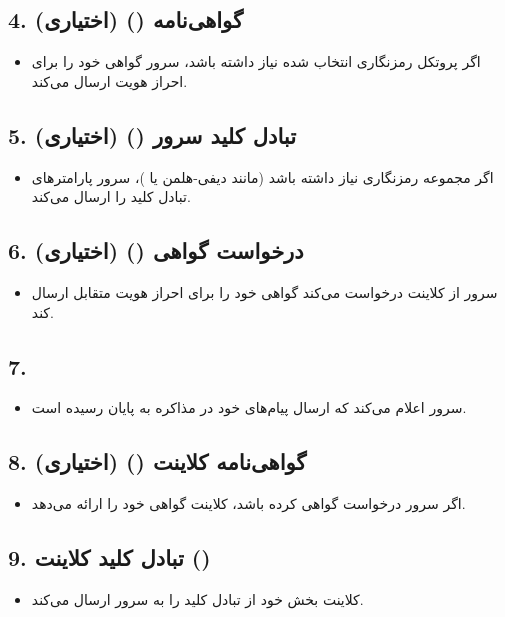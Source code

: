 \subsection*{4. گواهی‌نامه () (اختیاری)}
\begin{itemize}
    \item اگر پروتکل رمزنگاری انتخاب شده نیاز داشته باشد، سرور گواهی خود را برای احراز هویت ارسال می‌کند.
\end{itemize}

\subsection*{5. تبادل کلید سرور () (اختیاری)}
\begin{itemize}
    \item اگر مجموعه رمزنگاری نیاز داشته باشد (مانند دیفی-هلمن یا )، سرور پارامترهای تبادل کلید را ارسال می‌کند.
\end{itemize}

\subsection*{6. درخواست گواهی () (اختیاری)}
\begin{itemize}
    \item سرور از کلاینت درخواست می‌کند گواهی خود را برای احراز هویت متقابل ارسال کند.
\end{itemize}

\subsection*{7. }
\begin{itemize}
    \item سرور اعلام می‌کند که ارسال پیام‌های خود در مذاکره به پایان رسیده است.
\end{itemize}

\subsection*{8. گواهی‌نامه کلاینت () (اختیاری)}
\begin{itemize}
    \item اگر سرور درخواست گواهی کرده باشد، کلاینت گواهی خود را ارائه می‌دهد.
\end{itemize}

\subsection*{9. تبادل کلید کلاینت ()}
\begin{itemize}
    \item کلاینت بخش خود از تبادل کلید را به سرور ارسال می‌کند.
\end{itemize}

